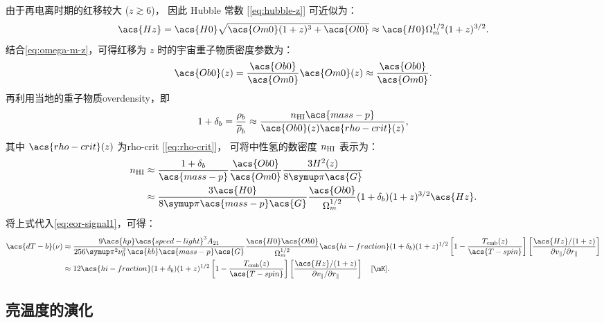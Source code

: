 由于再电离时期的红移较大 ($z \gtrsim 6$)，
因此 Hubble 常数 [\autoref{eq:hubble-z}] 可近似为：
\begin{equation}
  \acs{Hz} = \acs{H0} \sqrt{\acs{Om0} (1+z)^3 + \acs{Ol0}}
    \approx \acs{H0} \Omega_m^{1/2} (1+z)^{3/2} .
\end{equation}
结合\autoref{eq:omega-m-z}，可得红移为 $z$ 时的宇宙重子物质密度参数为：
\begin{equation}
  \acs{Ob0}(z) = \frac{\acs{Ob0}}{\acs{Om0}} \acs{Om0}(z)
    \approx \frac{\acs{Ob0}}{\acs{Om0}} .
\end{equation}
再利用当地的重子物质\ac{overdensity}，即
\begin{equation}
  1 + \delta_b = \frac{\rho_b}{\overline{\rho}_b}
    \approx \frac{n_{\R{HI}} \acs{mass-p}}{\acs{Ob0}(z) \acs{rho-crit}(z)} ,
\end{equation}
其中 $\acs{rho-crit}(z)$ 为\acl{rho-crit} [\autoref{eq:rho-crit}]，
可将中性氢的数密度 $n_{\mathrm{HI}}$ 表示为：
\begin{align}
  n_{\R{HI}}
    & \approx \frac{1+\delta_b}{\acs{mass-p}} \frac{\acs{Ob0}}{\acs{Om0}}
      \frac{3 H^2(z)}{8 \Cpi \acs{G}}  \\
    & \approx \frac{3 \acs{H0}}{8\Cpi\acs{mass-p}\acs{G}}
      \frac{\acs{Ob0}}{\Omega_m^{1/2}} (1+\delta_b) (1+z)^{3/2} \acs{Hz} .
\end{align}
将上式代入\autoref{eq:eor-signal1}，可得：
\begin{align}
  \label{eq:eor-signal}
  \acs{dT-b}(\nu)
    & \approx \frac{9 \acs{hp} \acs{speed-light}^3 A_{21}}{
      256\Cpi^2 \nu_0^2 \,\acs{kb} \acs{mass-p} \acs{G}}
      \frac{\acs{H0} \acs{Ob0}}{\Omega_m^{1/2}}
      \acs{hi-fraction} (1+\delta_b) (1+z)^{1/2}
      \left[ 1 - \frac{T_{\R{cmb}}(z)}{\acs{T-spin}} \right]
      \left[ \frac{\acs{Hz} / (1+z)}{
        \partial v_{\parallel} / \partial r_{\parallel}} \right]  \\
    & \approx 12 \acs{hi-fraction} (1+\delta_b) (1+z)^{1/2}
      \left[ 1 - \frac{T_{\R{cmb}}(z)}{\acs{T-spin}} \right]
      \left[ \frac{\acs{Hz} / (1+z)}{
        \partial v_{\parallel} / \partial r_{\parallel}} \right]
      \quad [\si{\mK}]  .
\end{align}

\subsection{亮温度的演化}

